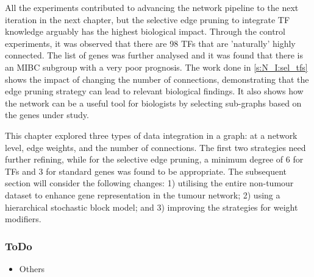 All the experiments contributed to advancing the network pipeline to the next iteration in the next chapter, but the selective edge pruning to integrate TF knowledge arguably has the highest biological impact. Through the control experiments, it was observed that there are 98 TFs that are 'naturally' highly connected. The list of genes was further analysed and it was found that there is an MIBC subgroup with a very poor prognosis. The work done in \cref{s:N_I:sel_tfs} shows the impact of changing the number of connections, demonstrating that the edge pruning strategy can lead to relevant biological findings. It also shows how the network can be a useful tool for biologists by selecting sub-graphs based on the genes under study.


This chapter explored three types of data integration in a graph: at a network level, edge weights, and the number of connections. The first two strategies need further refining, while for the selective edge pruning, a minimum degree of 6 for TFs and 3 for standard genes was found to be appropriate. The subsequent section will consider the following changes: 1) utilising the entire non-tumour dataset to enhance gene representation in the tumour network; 2) using a hierarchical stochastic block model; and 3) improving the strategies for weight modifiers.


\newpage

\subsubsection{ToDo}

\begin{itemize}
    \item Others 
\end{itemize}

